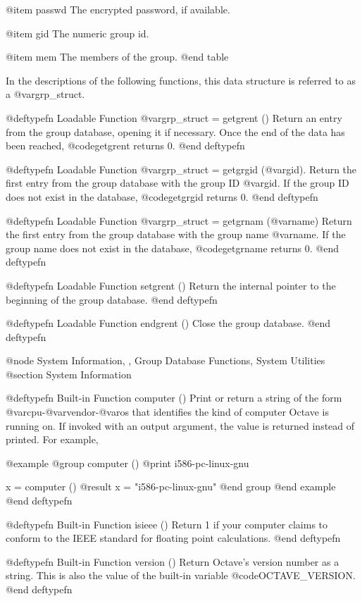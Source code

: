 {{@item passwd
The encrypted password, if available.

@item gid
The numeric group id.

@item mem
The members of the group.
@end table

In the descriptions of the following functions, this data structure is
referred to as a @var{grp_struct}.

@deftypefn {Loadable Function} {@var{grp_struct} =} getgrent ()
Return an entry from the group database, opening it if necessary.
Once the end of the data has been reached, @code{getgrent} returns 0.
@end deftypefn

@deftypefn {Loadable Function} {@var{grp_struct} =} getgrgid (@var{gid}).
Return the first entry from the group database with the group ID
@var{gid}.  If the group ID does not exist in the database,
@code{getgrgid} returns 0.
@end deftypefn

@deftypefn {Loadable Function} {@var{grp_struct} =} getgrnam (@var{name})
Return the first entry from the group database with the group name
@var{name}.  If the group name does not exist in the database,
@code{getgrname} returns 0.
@end deftypefn

@deftypefn {Loadable Function} {} setgrent ()
Return the internal pointer to the beginning of the group database.
@end deftypefn

@deftypefn {Loadable Function} {} endgrent ()
Close the group database.
@end deftypefn

@node System Information,  , Group Database Functions, System Utilities
@section System Information

@deftypefn {Built-in Function} {} computer ()
Print or return a string of the form @var{cpu}-@var{vendor}-@var{os}
that identifies the kind of computer Octave is running on.  If invoked
with an output argument, the value is returned instead of printed.  For
example,

@example
@group
computer ()
     @print{} i586-pc-linux-gnu

x = computer ()
     @result{} x = "i586-pc-linux-gnu"
@end group
@end example
@end deftypefn

@deftypefn {Built-in Function} {} isieee ()
Return 1 if your computer claims to conform to the IEEE standard for
floating point calculations.
@end deftypefn

@deftypefn {Built-in Function} {} version ()
Return Octave's version number as a string.  This is also the value of
the built-in variable @code{OCTAVE_VERSION}.
@end deftypefn

}}
